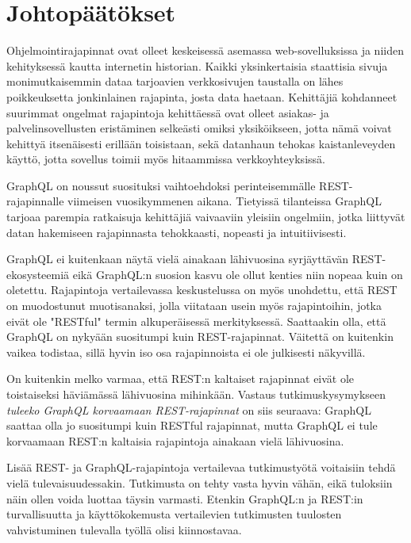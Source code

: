 \chapter{Johtopäätökset} \label{neljasluku}

\setlength{\parindent}{0em}
\setlength{\parskip}{1em}

Ohjelmointirajapinnat ovat olleet keskeisessä asemassa web-sovelluksissa ja niiden kehityksessä kautta internetin historian. Kaikki yksinkertaisia staattisia sivuja monimutkaisemmin dataa tarjoavien verkkosivujen taustalla on lähes poikkeuksetta jonkinlainen rajapinta, josta data haetaan. Kehittäjiä kohdanneet suurimmat ongelmat rajapintoja kehittäessä ovat olleet asiakas- ja palvelinsovellusten eristäminen selkeästi omiksi yksiköikseen, jotta nämä voivat kehittyä itsenäisesti erillään toisistaan, sekä datanhaun tehokas kaistanleveyden käyttö, jotta sovellus toimii myös hitaammissa verkkoyhteyksissä.

GraphQL on noussut suosituksi vaihtoehdoksi perinteisemmälle REST-rajapinnalle viimeisen vuosikymmenen aikana. Tietyissä tilanteissa GraphQL tarjoaa parempia ratkaisuja kehittäjiä vaivaaviin yleisiin ongelmiin, jotka liittyvät datan hakemiseen rajapinnasta tehokkaasti, nopeasti ja intuitiivisesti.

GraphQL ei kuitenkaan näytä vielä ainakaan lähivuosina syrjäyttävän REST-ekosysteemiä eikä GraphQL:n suosion kasvu ole ollut kenties niin nopeaa kuin on oletettu. Rajapintoja vertailevassa keskustelussa on myös unohdettu, että REST on muodostunut muotisanaksi, jolla viitataan usein myös rajapintoihin, jotka eivät ole "RESTful" termin alkuperäisessä merkityksessä. Saattaakin olla, että GraphQL on nykyään suositumpi kuin REST-rajapinnat. Väitettä on kuitenkin vaikea todistaa, sillä hyvin iso osa rajapinnoista ei ole julkisesti näkyvillä.

On kuitenkin melko varmaa, että REST:n kaltaiset rajapinnat eivät ole toistaiseksi häviämässä lähivuosina mihinkään. Vastaus tutkimuskysymykseen \textit{tuleeko GraphQL korvaamaan REST-rajapinnat} on siis seuraava: GraphQL saattaa olla jo suositumpi kuin RESTful rajapinnat, mutta GraphQL ei tule korvaamaan REST:n kaltaisia rajapintoja ainakaan vielä lähivuosina.

Lisää REST- ja GraphQL-rajapintoja vertailevaa tutkimustyötä voitaisiin tehdä vielä tulevaisuudessakin. Tutkimusta on tehty vasta hyvin vähän, eikä tuloksiin näin ollen voida luottaa täysin varmasti. Etenkin GraphQL:n ja REST:in turvallisuutta ja käyttökokemusta vertailevien tutkimusten tuulosten vahvistuminen tulevalla työllä olisi kiinnostavaa.